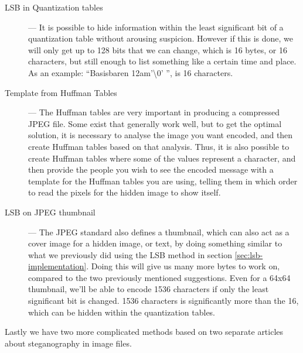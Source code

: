 \begin{description}
	\item[LSB in Quantization tables] ---
	It is possible to hide information within the least significant bit of a quantization table without arousing suspicion.
	However if this is done, we will only get up to 128 bits that we can change, which is 16 bytes, or 16 characters, but still enough to list 			something like a certain time and place.
	As an example: ``Basisbaren 12am'\textbackslash0' '', is 16 characters.
	
	\item[Template from Huffman Tables] ---
	The Huffman tables are very important in producing a compressed JPEG file.
	Some exist that generally work well, but to get the optimal solution, it is necessary to analyse the image you want encoded, and then create Huffman 		tables based on that analysis.
	Thus, it is also possible to create Huffman tables where some of the values represent a character, and then provide the people you wish to see the 			encoded	message with a template for the Huffman tables you are using, telling them in which order to read the pixels for the hidden image to show 			itself.
	
	\item[LSB on JPEG thumbnail] ---
	The JPEG standard also defines a thumbnail, which can also act as a cover image for a hidden image, or text, by doing something similar to what we previously did using the LSB method in section \ref{sec:lsb-implementation}.
	Doing this will give us many more bytes to work on, compared to the two previously mentioned suggestions.
	Even for a 64x64 thumbnail, we'll be able to encode 1536 characters if only the least significant bit is changed. 1536 characters is significantly more than the 16, which can be hidden within the quantization tables.
\end{description}

\noindent Lastly we have two more complicated methods based on two separate articles about steganography in image files.  

